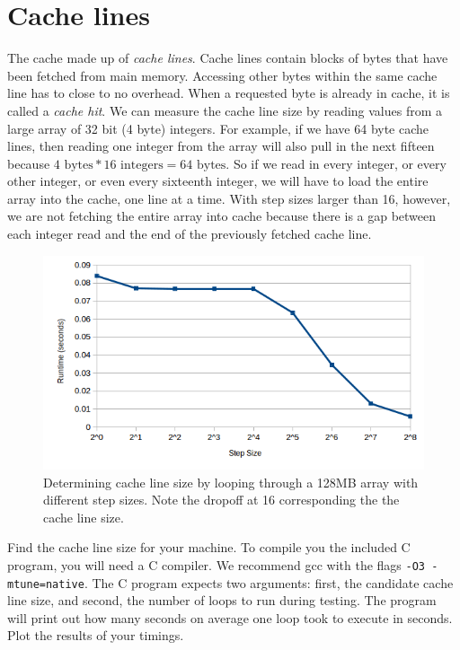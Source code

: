 \section*{Cache lines}
The cache made up of \emph{cache lines}.
Cache lines contain blocks of bytes that have been fetched from main memory.
Accessing other bytes within the same cache line has to close to no overhead.
When a requested byte is already in cache, it is called a \emph{cache hit}.
We can measure the cache line size by reading values from a large array of 32 bit (4 byte) integers.
For example, if we have 64 byte cache lines, then reading one integer from the array will also pull in the next fifteen because $4 \mbox{~bytes} * 16 \mbox{~integers} = 64 \mbox{~bytes}$.
So if we read in every integer, or every other integer, or even every sixteenth integer, we will have to load the entire array into the cache, one line at a time.
With step sizes larger than 16, however, we are not fetching the entire array into cache because there is a gap between each integer read and the end of the previously fetched cache line.
\begin{figure}[h]
\centering
\includegraphics[width=\textwidth]{cache_line.png}
\caption{Determining cache line size by looping through a 128MB array with different step sizes. Note the dropoff at 16 corresponding the the cache line size.}
\label{fig:linesize}
\end{figure}

\begin{problem}
Find the cache line size for your machine.
To compile you the included C program, you will need a C compiler.
We recommend gcc with the flags \texttt{-O3 -mtune=native}.
The C program expects two arguments: first, the candidate cache line size, and second, the number of loops to run during testing.
The program will print out how many seconds on average one loop took to execute in seconds.
Plot the results of your timings.
\label{prob:cacheline}
\end{problem}

